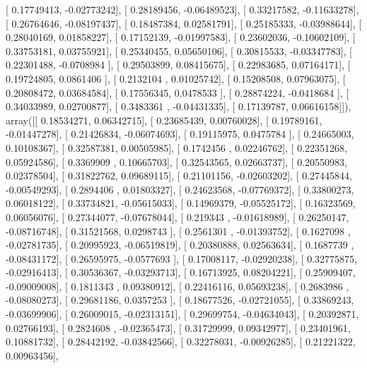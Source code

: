\documentclass{article}
\begin{document}
       [ 0.17749413, -0.02773242],
       [ 0.28189456, -0.06489523],
       [ 0.33217582, -0.11633278],
       [ 0.26764646, -0.08197437],
       [ 0.18487384,  0.02581791],
       [ 0.25185333, -0.03988644],
       [ 0.28040169,  0.01858227],
       [ 0.17152139, -0.01997583],
       [ 0.23602036, -0.10602109],
       [ 0.33753181,  0.03755921],
       [ 0.25340455,  0.05650106],
       [ 0.30815533, -0.03347783],
       [ 0.22301488, -0.0708984 ],
       [ 0.29503899,  0.08415675],
       [ 0.22983685,  0.07164171],
       [ 0.19724805,  0.0861406 ],
       [ 0.2132104 ,  0.01025742],
       [ 0.15208508,  0.07963075],
       [ 0.20808472,  0.03684584],
       [ 0.17556345,  0.0478533 ],
       [ 0.28874224, -0.0418684 ],
       [ 0.34033989,  0.02700877],
       [ 0.3483361 , -0.04431335],
       [ 0.17139787,  0.06616158]]), array([[ 0.18534271,  0.06342715],
       [ 0.23685439,  0.00760028],
       [ 0.19789161, -0.01447278],
       [ 0.21426834, -0.06074693],
       [ 0.19115975,  0.0475784 ],
       [ 0.24665003,  0.10108367],
       [ 0.32587381,  0.00505985],
       [ 0.1742456 ,  0.02246762],
       [ 0.22351268,  0.05924586],
       [ 0.3369909 ,  0.10665703],
       [ 0.32543565,  0.02663737],
       [ 0.20550983,  0.02378504],
       [ 0.31822762,  0.09689115],
       [ 0.21101156, -0.02603202],
       [ 0.27445844, -0.00549293],
       [ 0.2894406 ,  0.01803327],
       [ 0.24623568, -0.07769372],
       [ 0.33800273,  0.06018122],
       [ 0.33734821, -0.05615033],
       [ 0.14969379, -0.05525172],
       [ 0.16323569,  0.06056076],
       [ 0.27344077, -0.07678044],
       [ 0.219343  , -0.01618989],
       [ 0.26250147, -0.08716748],
       [ 0.31521568,  0.0298743 ],
       [ 0.2561301 , -0.01393752],
       [ 0.1627098 , -0.02781735],
       [ 0.20995923, -0.06519819],
       [ 0.20380888,  0.02563634],
       [ 0.1687739 , -0.08431172],
       [ 0.26595975, -0.0577693 ],
       [ 0.17008117, -0.02920238],
       [ 0.32775875, -0.02916413],
       [ 0.30536367, -0.03293713],
       [ 0.16713925,  0.08204221],
       [ 0.25909407, -0.09009008],
       [ 0.1811343 ,  0.09380912],
       [ 0.22416116,  0.05693238],
       [ 0.2683986 , -0.08080273],
       [ 0.29681186,  0.0357253 ],
       [ 0.18677526, -0.02721055],
       [ 0.33869243, -0.03699906],
       [ 0.26009015, -0.02313151],
       [ 0.29699754, -0.04634043],
       [ 0.20392871,  0.02766193],
       [ 0.2824608 , -0.02365473],
       [ 0.31729999,  0.09342977],
       [ 0.23401961,  0.10881732],
       [ 0.28442192, -0.03842566],
       [ 0.32278031, -0.00926285],
       [ 0.21221322,  0.00963456],
\end{document}
